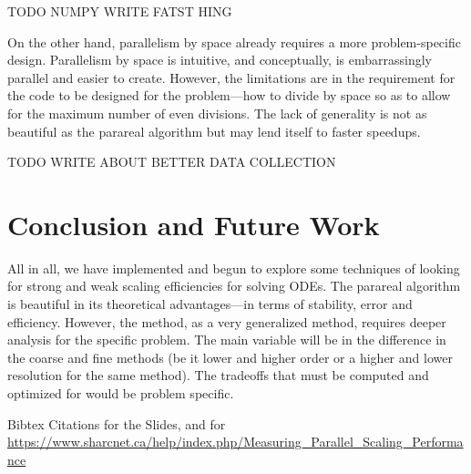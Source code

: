 \documentclass[letterpaper,12pt]{article}
\begin{document}
TODO NUMPY WRITE FATST HING

On the other hand, parallelism by space already requires a more problem-specific
design. Parallelism by space is intuitive, and conceptually, is embarrassingly parallel and easier to create. However, the
limitations are in the requirement for the code to be designed for the
problem---how to divide by space so as to allow for the maximum number of even
divisions. The lack of generality is not as beautiful as the parareal algorithm
but may lend itself to faster speedups.

TODO WRITE ABOUT BETTER DATA COLLECTION

\section{Conclusion and Future Work}

All in all, we have implemented and begun to explore some techniques of looking
for strong and weak scaling efficiencies for solving ODEs. The parareal
algorithm is beautiful in its theoretical advantages---in terms of stability,
error and efficiency. However, the method, as a very generalized method,
requires deeper analysis for the specific problem. The main variable will be in
the difference in the coarse and fine methods (be it lower and higher order or a
higher and lower resolution for the same method). The tradeoffs that must be
computed and optimized for would be problem specific.

\nocite{*}



Bibtex Citations for the Slides, and for \url{https://www.sharcnet.ca/help/index.php/Measuring_Parallel_Scaling_Performance}
\end{document}
